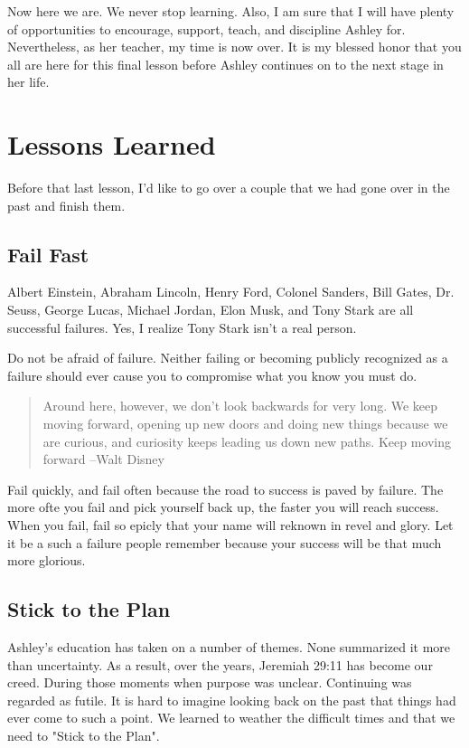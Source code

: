 \documentclass[11pt,a4paper,sans]{article}
\begin{document}
Now here we are. We never stop learning. Also, I am sure that I will have plenty of opportunities
to encourage, support, teach, and discipline Ashley for. Nevertheless, as her teacher, my time
is now over. It is my blessed honor that you all are here for this final lesson before Ashley
continues on to the next stage in her life.

\section{Lessons Learned}
Before that last lesson, I'd like to go over a couple that we had gone over in the past and
finish them.

\subsection{Fail Fast}
Albert Einstein, Abraham Lincoln, Henry Ford, Colonel Sanders, Bill Gates, Dr. Seuss, 
George Lucas, Michael Jordan, Elon Musk, and Tony Stark are all successful failures. Yes, I 
realize Tony Stark isn't a real person. 

Do not be afraid of failure. Neither failing or becoming publicly recognized as a failure 
should ever cause you to compromise what you know you must do. 

\begin{quote}
    Around here, however, we don't look backwards for very long. We keep moving
    forward, opening up new doors and doing new things because we are curious, and
    curiosity keeps leading us down new paths. Keep moving forward --Walt Disney
\end{quote}

Fail quickly, and fail often because the road to success is paved by failure. The more ofte
you fail and pick yourself back up, the faster you will reach success. When you fail, fail so 
epicly that your name will reknown in revel and glory. Let it be a such a failure people remember 
because your success will be that much more glorious.


\subsection{Stick to the Plan}
Ashley's education has taken on a number of themes. None summarized it more than uncertainty.
As a result, over the years, Jeremiah 29:11 has become our creed. During those moments when 
purpose was unclear. Continuing was regarded as futile. It is hard to imagine looking back on
the past that things had ever come to such a point. We learned to weather the difficult times
and that we need to "Stick to the Plan". 
\end{document}
